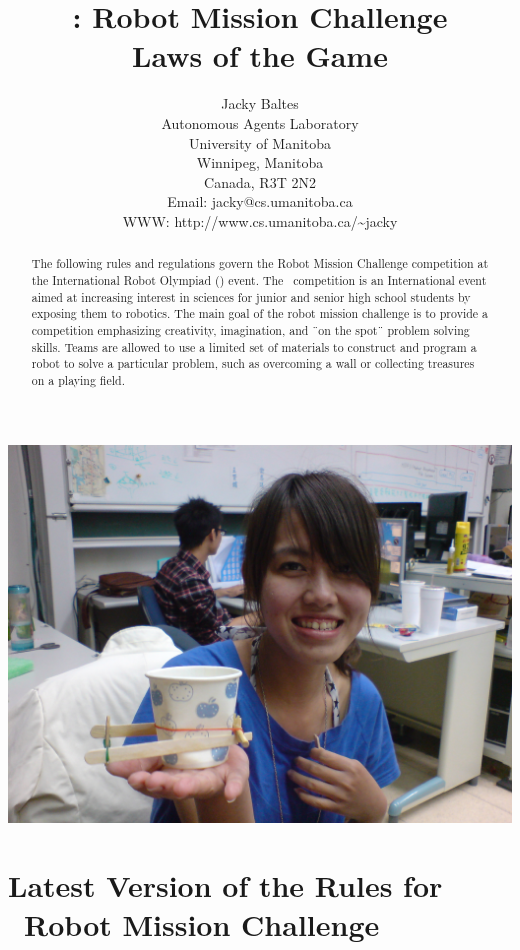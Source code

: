\documentclass[12pt]{hurocup}
\begin{document}
\title{\IROC: Robot Mission Challenge\\
  Laws of the Game \thisyear}

\author{Jacky Baltes\\
Autonomous Agents Laboratory\\
University of Manitoba\\
Winnipeg, Manitoba\\
Canada, R3T 2N2\\
Email: jacky@cs.umanitoba.ca\\
WWW: http://www.cs.umanitoba.ca/\~{ }jacky
}

\maketitle

\begin{center}
 \includegraphics[width=0.7\linewidth]{Figures/junkyard_challenge_life}
\end{center}

\begin{abstract}
The following rules and regulations govern the Robot Mission Challenge
competition at the International Robot Olympiad (\IROC) event. The
\IROC\ competition is an International event aimed at increasing
interest in sciences for junior and senior high school students by
exposing them to robotics.
%
The main goal of the robot mission challenge is to provide a competition
emphasizing creativity, imagination, and ¨on the spot¨ problem solving
skills.
%
Teams are allowed to use a limited set of materials to construct and
program a robot to solve a particular problem, such as overcoming a
wall or collecting treasures on a playing field.
\end{abstract}

\section*{Latest Version of the Rules for \IROC\ Robot Mission Challenge}
\label{sec:updates}
\end{document}
